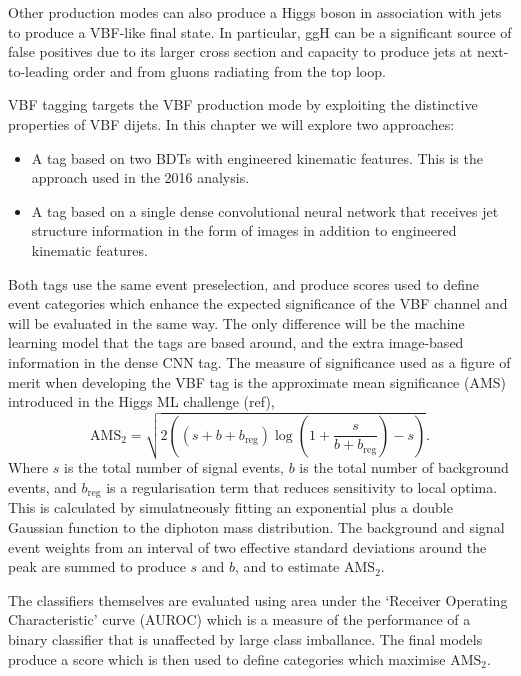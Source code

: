 Other production modes can also produce a Higgs boson in association with jets to produce a VBF-like final state. 
In particular, ggH can be a significant source of false positives due to its larger cross section and capacity to produce jets at next-to-leading order and from gluons radiating from the top loop. 

VBF tagging targets the VBF production mode by exploiting the distinctive properties of VBF dijets. In this chapter we will explore two approaches:
\begin{itemize}[leftmargin=.5in,noitemsep]
    \item A tag based on two BDTs with engineered kinematic features. This is the approach used in the 2016 \Hgg analysis. 
    \item A tag based on a single dense convolutional neural network that receives jet structure information in the form of images in addition to engineered kinematic features. 
\end{itemize}
Both tags use the same event preselection, and produce scores used to define event categories which enhance the expected significance of the VBF channel and will be evaluated in the same way. The only difference will be the machine learning model that the tags are based around, and the extra image-based information in the dense CNN tag.  
The measure of significance used as a figure of merit when developing the VBF tag is the approximate mean significance (AMS) introduced in the Higgs ML challenge (ref),
\begin{equation}
    \mathrm{AMS}_{2} = \sqrt{2\left( (s+b+b_{\mathrm{reg}})\log\left(1 + \frac{s}{b+b_{\mathrm{reg}}}\right) - s \right)}.
\end{equation}
Where $s$ is the total number of signal events, $b$ is the total number of background events, and $b_{\mathrm{reg}}$ is a regularisation term that reduces sensitivity to local optima. 
This is calculated by simulatneously fitting an exponential plus a double Gaussian function to the diphoton mass distribution. The background and signal event weights from an interval of two effective standard deviations around the peak are summed to produce $s$ and $b$, and to estimate $\mathrm{AMS}_{2}$. 

The classifiers themselves are evaluated using area under the `Receiver Operating Characteristic' curve (AUROC) which is a measure of the performance of a binary classifier that is unaffected by large class imballance. The final models produce a score which is then used to define categories which maximise $\mathrm{AMS}_{2}$.







